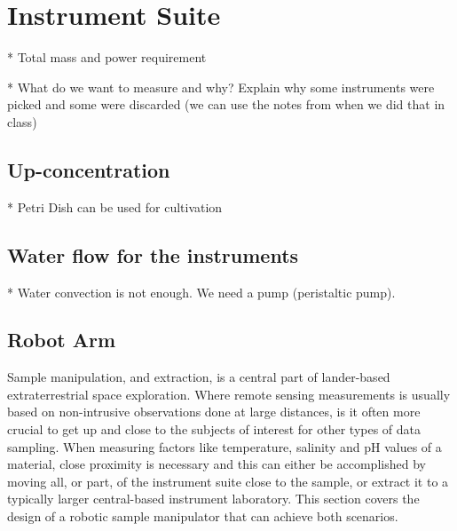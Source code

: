 \chapter{Instrument Suite}

* Total mass and power requirement

* What do we want to measure and why? Explain why some instruments were picked and some were discarded (we can use the notes from when we did that in class)

\section{Up-concentration}

* Petri Dish can be used for cultivation

\section{Water flow for the instruments} %

* Water convection is not enough. We need a pump (peristaltic pump).
\section{Robot Arm} %
Sample manipulation, and extraction, is a central part of lander-based extraterrestrial space exploration. Where remote sensing measurements is usually based on non-intrusive observations done at large distances, is it often more crucial to get up and close to the subjects of interest for other types of data sampling. When measuring factors like temperature, salinity and pH values of a material, close proximity is necessary and this can either be accomplished by moving all, or part, of the instrument suite close to the sample, or extract it to a typically larger central-based instrument laboratory. This section covers the design of a robotic sample manipulator that can achieve both scenarios.


